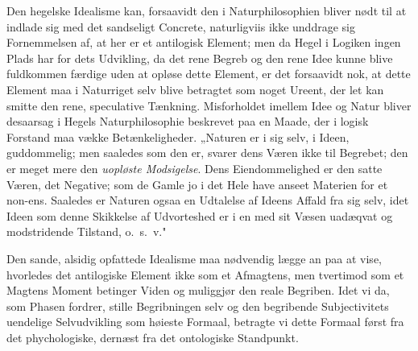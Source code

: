 \documentclass[12pt]{book}
\newcommand{\opage}[1]{\marginnote{\footnotesize\textit{[#1]}}}
\begin{document}
Den hegelske Idealisme kan, forsaavidt den i Naturphilosophien bliver nødt til at indlade sig med
det sandseligt Concrete, naturligviis ikke unddrage sig Fornemmelsen af, at her er et antilogisk
Element; men da Hegel i Logiken ingen Plads har for dets Udvikling, da det rene Begreb og den
rene Idee kunne blive fuldkommen færdige uden at opløse dette Element, er det forsaavidt nok, at
dette Element maa i Naturriget selv blive betragtet som noget Ureent, der let kan smitte den
rene, speculative Tænkning. Misforholdet imellem Idee og Natur bliver desaarsag i Hegels
Naturphilosophie beskrevet paa en Maade, der i logisk Forstand maa vække
\opage{189} Betænkeligheder. „Naturen er i sig selv, i Ideen, guddommelig; men saaledes som den er, svarer
dens Væren ikke til Begrebet; den er meget mere den \emph{uopløste Modsigelse}. Dens
Eiendommelighed er den satte Væren, det Negative; som de Gamle jo i det Hele have anseet Materien
for et non-ens. Saaledes er Naturen ogsaa en Udtalelse af Ideens Affald fra sig selv, idet Ideen
som denne Skikkelse af Udvorteshed er i en med sit Væsen uadæqvat og modstridende Tilstand, o.\
s.\ v."

Den sande, alsidig opfattede Idealisme maa nødvendig lægge an paa at vise, hvorledes det
antilogiske Element ikke som et Afmagtens, men tvertimod som et Magtens Moment betinger Viden og
muliggjør den reale Begriben. Idet vi da, som Phasen fordrer, stille Begribningen selv og den
begribende Subjectivitets uendelige Selvudvikling som høieste Formaal, betragte vi dette Formaal
først fra det phychologiske, dernæst fra det ontologiske Standpunkt.
\end{document}

